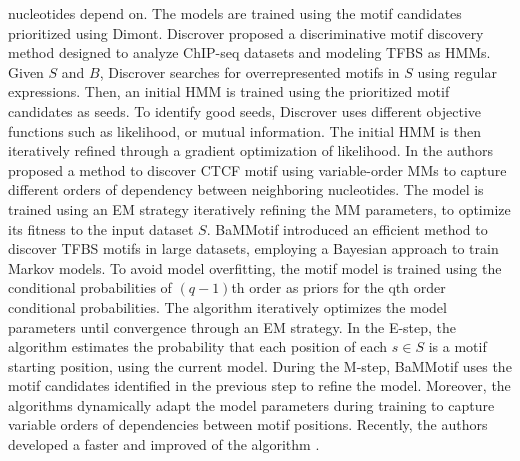 \documentclass[a4paper, titlepage, 8pt, openright]{book}
\begin{document}
nucleotides depend on. The models are trained using the motif candidates prioritized using Dimont. Discrover \citep{maaskola2014binding} proposed a discriminative motif discovery method designed to analyze ChIP-seq datasets and modeling TFBS as HMMs. Given $S$ and $B$, Discrover searches for overrepresented motifs in $S$ using regular expressions. Then, an initial HMM is trained using the prioritized motif candidates as seeds. To identify good seeds, Discrover uses different objective functions such as likelihood, or mutual information. The initial HMM is then iteratively refined through a gradient optimization of likelihood. In \citep{eggeling2014value} the authors proposed a method to discover CTCF \citep{bell1999protein} motif using variable-order MMs to capture different orders of dependency between neighboring nucleotides. The model is trained using an EM strategy iteratively refining the MM parameters, to optimize its fitness to the input dataset $S$. BaMMotif \citep{siebert2016bayesian} introduced an efficient method to discover TFBS motifs in large datasets, employing a Bayesian approach to train Markov models. To avoid model overfitting, the motif model is trained using the conditional probabilities of $(q-1)$th order as priors for the qth order conditional probabilities. The algorithm iteratively optimizes the model parameters until convergence through an EM strategy. In the E-step, the algorithm estimates the probability that each position of each $s \in S$ is a motif starting position, using the current model. During the M-step, BaMMotif uses the motif candidates identified in the previous step to refine the model. Moreover, the algorithms dynamically adapt the model parameters during training to capture variable orders of dependencies between motif positions. Recently, the authors developed a faster and improved of the algorithm \citep{ge2021bayesian}.
\end{document}
